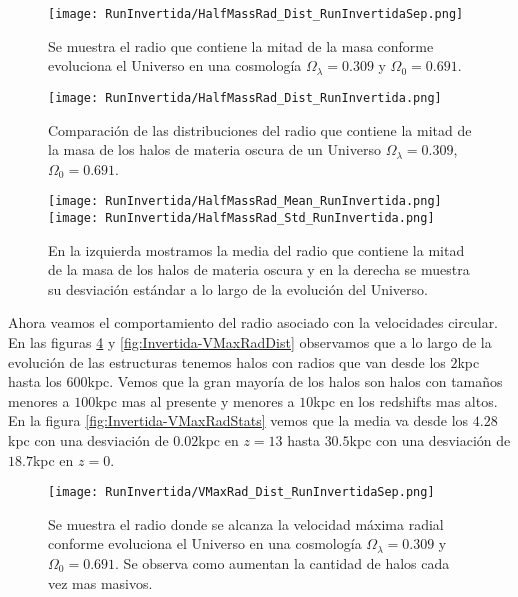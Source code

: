\begin{figure}[H]
    \centering
    \texttt{[image: RunInvertida/HalfMassRad\_Dist\_RunInvertidaSep.png]}
    \caption[Radio que contiene la mitad de la masa]{\footnotesize Se muestra el radio que contiene la mitad de la masa conforme evoluciona el Universo en una cosmología $\Omega_\lambda = 0.309 $ y $\Omega_0 = 0.691$.}
    \label{fig:Invertida-HalfMassRadDistSep}
\end{figure}

\begin{figure}[H]
    \centering
    \texttt{[image: RunInvertida/HalfMassRad\_Dist\_RunInvertida.png]}
    \caption[Distribución del Radio que contiene la mitad de la masa]{\footnotesize Comparación de las distribuciones del radio que contiene la mitad de la masa de los halos de materia oscura de un Universo $\Omega_\lambda = 0.309 $, $\Omega_0 = 0.691$.}
    \label{fig:Invertida-HalfMassRadDist}
\end{figure}

\begin{figure}[H]
    \centering
    \texttt{[image: RunInvertida/HalfMassRad\_Mean\_RunInvertida.png]}
    \texttt{[image: RunInvertida/HalfMassRad\_Std\_RunInvertida.png]}
    \caption[Media y desviación estándar del radio de la mitad de la masa]{\footnotesize En la izquierda mostramos la media del radio que contiene la mitad de la masa de los halos de materia oscura y en la derecha se muestra su desviación estándar a lo largo de la evolución del Universo.}
    \label{fig:Invertida-HalfMassRadStats}
\end{figure}

Ahora veamos el comportamiento del radio asociado con la velocidades circular. En las figuras \ref{fig:Invertida-VMaxRadDistSep} y \ref{fig:Invertida-VMaxRadDist} observamos que a lo largo de la evolución de las estructuras tenemos halos con radios que van desde los $2$kpc hasta los $600$kpc. Vemos que la gran mayoría de los halos son halos con tamaños menores a $100$kpc mas al presente y menores a $10$kpc en los redshifts mas altos. En la figura \ref{fig:Invertida-VMaxRadStats} vemos que la media va desde los $4.28$kpc con una desviación de $0.02$kpc en $z=13$ hasta $30.5$kpc con una desviación de $18.7$kpc en $z=0$.

\begin{figure}[H]
    \centering
    \texttt{[image: RunInvertida/VMaxRad\_Dist\_RunInvertidaSep.png]}
    \caption[Radio donde se alcanza la velocidad máxima radial]{\footnotesize Se muestra el radio donde se alcanza la velocidad máxima radial conforme evoluciona el Universo en una cosmología $\Omega_\lambda = 0.309 $ y $\Omega_0 = 0.691$. Se observa como aumentan la cantidad de halos cada vez mas masivos.}
    \label{fig:Invertida-VMaxRadDistSep}
\end{figure}

